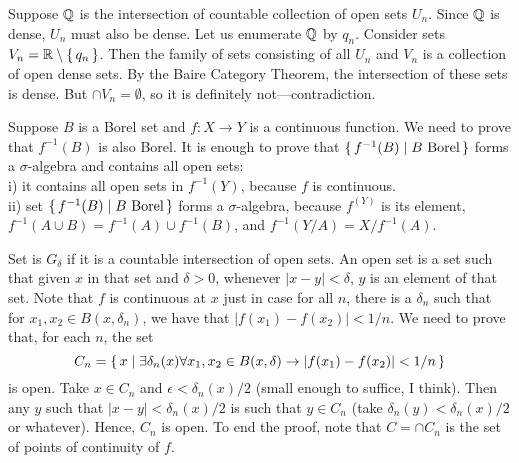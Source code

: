 \documentclass[12pt]{article}
\theoremstyle{definition}
\newenvironment{customthm}[1]
  {\renewcommand\theinnercustomthm{#1}\innercustomthm}
  {\endinnercustomthm}
\begin{document}
\begin{customthm}{I.4.14}
    Suppose ${\mathbb Q}$ is the intersection of countable collection of open sets $U_n$. Since ${\mathbb Q}$ is dense, $U_n$ must also be dense. Let us enumerate ${\mathbb Q}$ by $q_n$. Consider sets $V_n = {\mathbb R} \setminus \{\,{q_n}\,\}$. Then the family of sets consisting of all $U_n$ and $V_n$ is a collection of open dense sets. By the Baire Category Theorem, the intersection of these sets is dense. But $\cap V_n = \emptyset$, so it is definitely not---contradiction.
\end{customthm}

\begin{customthm}{I.4.15}
    Suppose $B$ is a Borel set and $f \colon X \to Y$ is a continuous function. We need to prove that $f^{-1}(B)$ is also Borel. It is enough to prove that $\{\,{f^{-1}(B) \mid B \text{ Borel}}\,\}$ forms a $\sigma$-algebra and contains all open sets:
    \\
    i) it contains all open sets in $f^{-1}(Y)$, because $f$ is continuous.
    \\
    ii) set $\{\,{f^{-1}(B) \mid B \text{ Borel}}\,\}$ forms a $\sigma$-algebra, because $f^(Y)$ is its element, $f^{-1}(A \cup B) = f^{-1}(A) \cup f^{-1}(B)$, and $f^{-1}(Y/A) = X/f^{-1}(A)$.
\end{customthm}

\begin{customthm}{I.4.16}
    Set is $G_\delta$ if it is a countable intersection of open sets. An open set is a set such that given $x$ in that set and $\delta > 0$, whenever $|x-y| < \delta$, $y$ is an element of that set. Note that $f$ is continuous at $x$ just in case for all $n$, there is a $\delta_n$ such that for $x_1,x_2 \in B(x,\delta_n)$, we have that $|f(x_1)-f(x_2)|<1/n$. We need to prove that, for each $n$, the set
    \begin{equation*}
        C_n = \{\,{x \mid \exists \delta_n(x) \forall x_1,x_2 \in B(x, \delta) \mathrel{\rightarrow} |f(x_1) - f(x_2)| < 1/n}\,\}
    \end{equation*}
    is open. Take $x \in C_n$ and $\epsilon<\delta_n(x)/2$ (small enough to suffice, I think). Then any $y$ such that $|x-y|<\delta_n(x)/2$ is such that $y \in C_n$ (take $\delta_n(y)<\delta_n(x)/2$ or whatever). Hence, $C_n$ is open. To end the proof, note that $C = \cap C_n$ is the set of points of continuity of $f$.
\end{customthm}
\end{document}
